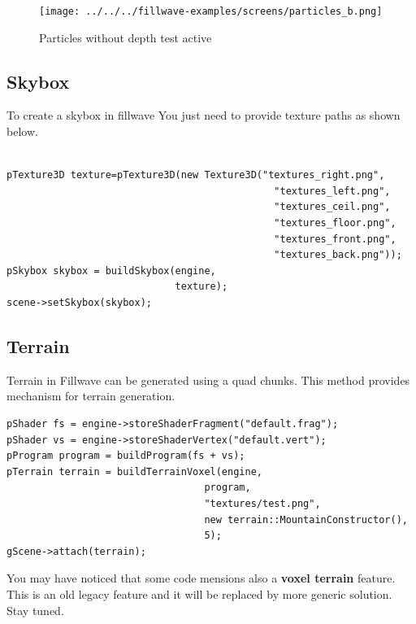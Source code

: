 \documentclass{article}
\begin{document}
\begin{figure}
    \centering
    \texttt{[image: ../../../fillwave-examples/screens/particles\_b.png]}
    \caption{Particles without depth test active}
    \label{particle_no_depth_test}
\end{figure}

\newpage

\subsection{Skybox}\label{sec:Skybox}

\indent \indent To create a skybox in fillwave You just need to provide texture paths as shown below.

\begin{lstlisting}

pTexture3D texture=pTexture3D(new Texture3D("textures_right.png",
                                              "textures_left.png",
                                              "textures_ceil.png",
                                              "textures_floor.png",
                                              "textures_front.png",
                                              "textures_back.png"));
pSkybox skybox = buildSkybox(engine,
                             texture);
scene->setSkybox(skybox);
\end{lstlisting}

\subsection{Terrain}\label{sec:Terrain}
\indent \indent Terrain in Fillwave can be generated using a quad chunks. This method provides mechanism for terrain generation.


\begin{lstlisting}
pShader fs = engine->storeShaderFragment("default.frag");
pShader vs = engine->storeShaderVertex("default.vert");
pProgram program = buildProgram(fs + vs);
pTerrain terrain = buildTerrainVoxel(engine,
                                  program,
                                  "textures/test.png",
                                  new terrain::MountainConstructor(),
                                  5);
gScene->attach(terrain);
\end{lstlisting}

\indent You may have noticed that some code mensions also a \textbf{voxel terrain} feature. This is an old legacy feature and it will be replaced by more generic solution. Stay tuned.
\end{document}
